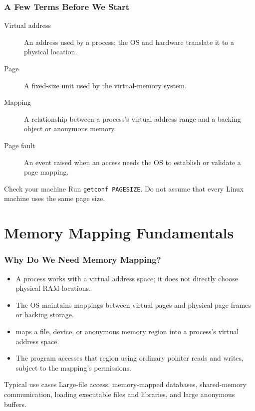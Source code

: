 \documentclass[10pt,hyperref={bookmarks=false},aspectratio=169,usenames,dvipsnames,hideothersubsections]{beamer}
\newcommand{\cmd}[1]{\texttt{#1}}
\newcommand{\code}[1]{\texttt{\detokenize{#1}}}
\begin{document}
\begin{frame}
\frametitle{A Few Terms Before We Start}
\begin{description}
  \item[Virtual address] An address used by a process; the OS and hardware translate it to a physical location.
  \item[Page] A fixed-size unit used by the virtual-memory system.
  \item[Mapping] A relationship between a process's virtual address range and a backing object or anonymous memory.
  \item[Page fault] An event raised when an access needs the OS to establish or validate a page mapping.
\end{description}
\begin{block}{Check your machine}
Run \cmd{getconf PAGESIZE}. Do not assume that every Linux machine uses the same page size.
\end{block}
\end{frame}

\section{Memory Mapping Fundamentals}

\begin{frame}
\frametitle{Why Do We Need Memory Mapping?}
\begin{itemize}
  \item A process works with a \alert{virtual address space}; it does not directly choose physical RAM locations.
  \item The OS maintains mappings between virtual pages and physical page frames or backing storage.
  \item \code{mmap()} maps a file, device, or anonymous memory region into a process's virtual address space.
  \item The program accesses that region using ordinary pointer reads and writes, subject to the mapping's permissions.
\end{itemize}
\begin{block}{Typical use cases}
Large-file access, memory-mapped databases, shared-memory communication, loading executable files and libraries, and large anonymous buffers.
\end{block}
\end{frame}
\end{document}
